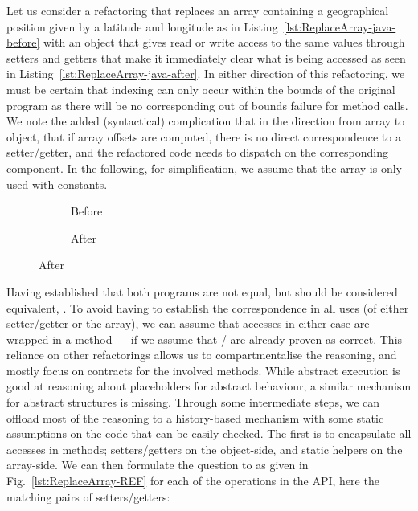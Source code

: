 Let us consider a refactoring that replaces an array containing a geographical position given by a latitude and longitude as in Listing~\ref{lst:ReplaceArray-java-before} with an object that gives read or write access to the same values through setters and getters that make it immediately clear what is being accessed as seen in Listing~\ref{lst:ReplaceArray-java-after}.
In either direction of this refactoring, we must be certain that indexing can only occur within the bounds of the original program as there will be no corresponding out of bounds failure for method calls.
We note the added (syntactical) complication that in the direction from array to object, that if array offsets are computed, there is no direct correspondence to a setter/getter,
and the refactored code needs to dispatch on the corresponding component.
In the following, for simplification, we assume that the array is only used with constants.



\begin{figure}
  \begin{subfigure}[h]{.45\linewidth} 
    
    \caption{Before}
    \label{refa:ReplaceArray-java-before}   
  \end{subfigure}\hspace{1cm}
  \begin{subfigure}[h]{.45\linewidth}
    
    \caption{After}
    \label{refa:ReplaceArray-java-after}
  \end{subfigure}
  \label{refa:ReplaceArray-java}
\end{figure}

Having established that both programs are not equal, but should be considered equivalent,  .
To avoid having to establish the correspondence in all uses (of either setter/getter or the array),
we can assume that accesses in either case are wrapped in a method --- if we assume that / are already proven as correct.
This reliance on other refactorings allows us to compartmentalise the reasoning, and mostly focus on contracts for the involved methods.
While abstract execution is good at reasoning about placeholders for abstract behaviour, a similar mechanism for abstract structures is missing.
Through some intermediate steps, we can offload most of the reasoning to a history-based mechanism with some static assumptions on the code that can be easily checked.
The first is to encapsulate all accesses in methods; setters/getters on the object-side, and static helpers on the array-side.
We can then formulate the question to \Refinity{} as given in Fig.~\ref{lst:ReplaceArray-REF} for each of the operations in the API, here the matching pairs of setters/getters:


